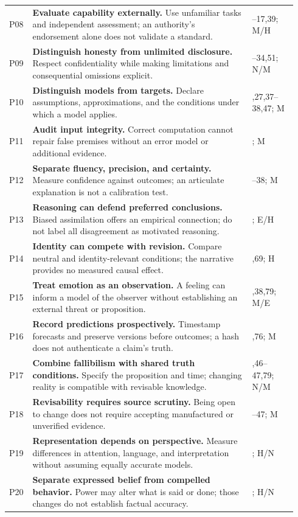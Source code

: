 \begin{longtable}{@{}>{\raggedright\arraybackslash}p{0.055\linewidth}>{\raggedright\arraybackslash}p{0.735\linewidth}>{\raggedright\arraybackslash}p{0.15\linewidth}@{}}
P08 & \textbf{Evaluate capability externally.} Use unfamiliar tasks and independent assessment; an authority's endorsement alone does not validate a standard. & 16--17,39; M/H\\[0.5em]
P09 & \textbf{Distinguish honesty from unlimited disclosure.} Respect confidentiality while making limitations and consequential omissions explicit. & 33--34,51; N/M\\[0.5em]
P10 & \textbf{Distinguish models from targets.} Declare assumptions, approximations, and the conditions under which a model applies. & 19,27,37--38,47; M\\[0.5em]
P11 & \textbf{Audit input integrity.} Correct computation cannot repair false premises without an error model or additional evidence. & 36; M\\[0.5em]
P12 & \textbf{Separate fluency, precision, and certainty.} Measure confidence against outcomes; an articulate explanation is not a calibration test. & 37--38; M\\[0.5em]
P13 & \textbf{Reasoning can defend preferred conclusions.} Biased assimilation offers an empirical connection; do not label all disagreement as motivated reasoning. & 38; E/H\\[0.5em]
P14 & \textbf{Identity can compete with revision.} Compare neutral and identity-relevant conditions; the narrative provides no measured causal effect. & 38,69; H\\[0.5em]
P15 & \textbf{Treat emotion as an observation.} A feeling can inform a model of the observer without establishing an external threat or proposition. & 13,38,79; M/E\\[0.5em]
P16 & \textbf{Record predictions prospectively.} Timestamp forecasts and preserve versions before outcomes; a hash does not authenticate a claim's truth. & 45,76; M\\[0.5em]
P17 & \textbf{Combine fallibilism with shared truth conditions.} Specify the proposition and time; changing reality is compatible with revisable knowledge. & 35,46--47,79; N/M\\[0.5em]
P18 & \textbf{Revisability requires source scrutiny.} Being open to change does not require accepting manufactured or unverified evidence. & 46--47; M\\[0.5em]
P19 & \textbf{Representation depends on perspective.} Measure differences in attention, language, and interpretation without assuming equally accurate models. & 47; H/N\\[0.5em]
P20 & \textbf{Separate expressed belief from compelled behavior.} Power may alter what is said or done; those changes do not establish factual accuracy. & 47; H/N\\[0.5em]

\end{longtable}

